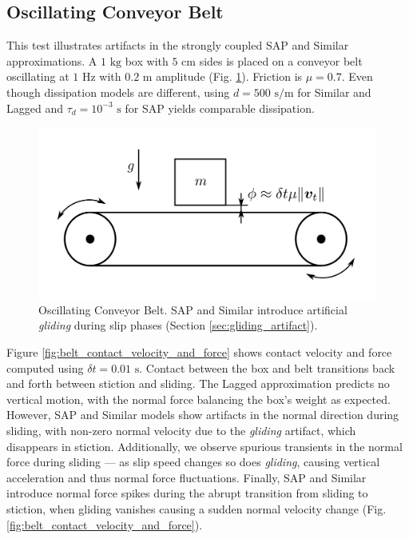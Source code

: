 \subsection{Oscillating Conveyor Belt}

This test illustrates artifacts in the strongly coupled SAP and Similar
approximations. A $1 \text{ kg}$ box with $5\text{ cm}$ sides is placed on a
conveyor belt oscillating at $1 \text{ Hz}$ with $0.2 \text{ m}$ amplitude (Fig.
\ref{fig:belt_shematic}). Friction is $\mu=0.7$. Even though dissipation models
are different, using $d=500 \text{ s/m}$ for Similar and Lagged and
$\tau_d=10^{-3} \text{ s}$ for SAP yields comparable dissipation.

\begin{figure}[!h]
    \centering
    \includegraphics[width=0.8\columnwidth]{figures/TestCases/Belt/belt_schematics.png}
    \caption{Oscillating Conveyor Belt. SAP and Similar introduce artificial
    \emph{gliding} during slip phases (Section \ref{sec:gliding_artifact}).}
    \label{fig:belt_shematic}
\end{figure}

Figure \ref{fig:belt_contact_velocity_and_force} shows contact velocity and
force computed using $\delta t=0.01\text{ s}$. Contact between the box and belt
transitions back and forth between stiction and sliding. The Lagged
approximation predicts no vertical motion, with the normal force balancing the
box's weight as expected. However, SAP and Similar models show artifacts in the
normal direction during sliding, with non-zero normal velocity due to the
\emph{gliding} artifact, which disappears in stiction. Additionally, we observe
spurious transients in the normal force during sliding --- as slip speed changes
so does \emph{gliding}, causing vertical acceleration and thus normal force
fluctuations. Finally, SAP and Similar introduce normal force spikes
during the abrupt transition from sliding to stiction, when gliding vanishes
causing a sudden normal velocity change (Fig.
\ref{fig:belt_contact_velocity_and_force}).

